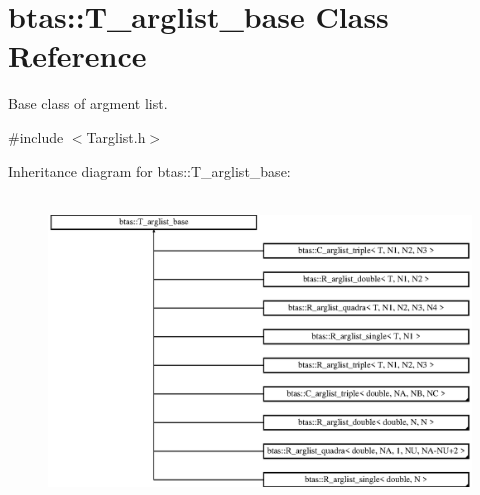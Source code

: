\section{btas\-:\-:T\-\_\-arglist\-\_\-base Class Reference}
\label{d7/dd4/classbtas_1_1T__arglist__base}


Base class of argment list.  




{\ttfamily \#include $<$Targlist.\-h$>$}

Inheritance diagram for btas\-:\-:T\-\_\-arglist\-\_\-base\-:\begin{figure}[H]
\begin{center}
\leavevmode
\includegraphics[height=8.235294cm]{d7/dd4/classbtas_1_1T__arglist__base}
\end{center}
\end{figure}
